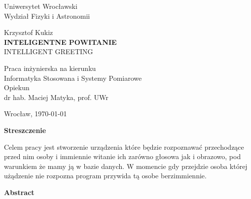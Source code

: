 \documentclass[a4paper,12pt,reqno]{article}
\begin{document}


\begin{center}

\thispagestyle{empty}

\Large 
Uniwersytet Wrocławski\\
Wydział Fizyki i Astronomii\\
\vspace{0.8cm}
\vspace{1.8cm}

\Large Krzysztof Kukiz \\
\vspace{3.2cm}
\Large \textbf{INTELIGENTNE POWITANIE} \\
\vspace{1.5cm}
INTELLIGENT GREETING
\end{center}
\vspace{3.7cm}
\begin{flushright}
\large{ Praca inżynierska na kierunku \\Informatyka Stosowana i Systemy Pomiarowe \\}
\vspace{0.5cm}
\large{ Opiekun \\ dr hab. Maciej Matyka, prof. UWr}
\end{flushright}
\vspace{2.2cm}

\begin{center}
\large Wrocław, \today
\end{center}

\newpage

\tableofcontents

\newpage

\begin{flushleft}
\Large \textbf{Streszczenie}
\end{flushleft}
\vspace{1cm}

Celem pracy jest stworzenie urządzenia które będzie rozpoznawać przechodzące przed nim osoby i immiennie witanie ich zarówno głosowa jak i obrazowo, pod warunkiem że mamy ją w bazie danych. W momencie gdy przejdzie osoba której użądzenie nie rozpozna program przywida tą osobe berzimmiennie.

\newpage
\begin{flushleft}
\Large \textbf{Abstract}
\end{flushleft}
\vspace{1cm}
\end{document}
